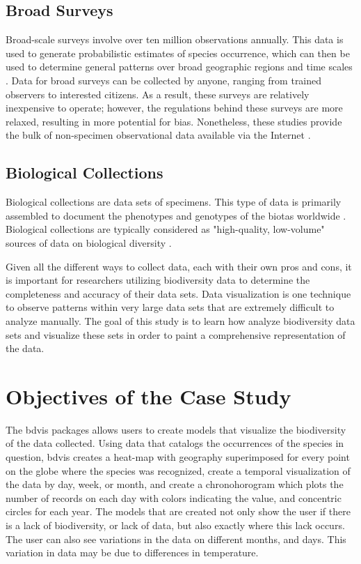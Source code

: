 \subsection{Broad  Surveys}

Broad-scale surveys involve over ten million observations annually.
This data is used to generate probabilistic estimates of species occurrence, which can then be used to determine general patterns over broad geographic regions and time scales \cite {GBIF}.
Data for broad surveys can be collected by anyone, ranging from trained observers to interested citizens.
As a result, these surveys are relatively inexpensive to operate; however, the regulations behind these surveys are more relaxed, resulting in more potential for bias.
Nonetheless, these studies provide the bulk of non-specimen observational data available via the Internet \cite {SP}.

\subsection{Biological Collections}

Biological collections are data sets of specimens.
This type of data is primarily assembled to document the phenotypes and genotypes of the biotas worldwide \cite{Barve}.
Biological collections are typically considered as "high-quality, low-volume" sources of data on biological diversity \cite{Barve}.

Given all the different ways to collect data, each with their own pros and cons, it is important for researchers utilizing biodiversity data to determine the completeness and accuracy of their data sets.
Data visualization is one technique to observe patterns within very large data sets that are extremely difficult to analyze manually.
The goal of this study is to learn how analyze biodiversity data sets and visualize these sets in order to paint a comprehensive representation of the data.

\section{Objectives of the Case Study}

The bdvis packages allows users to create models that visualize the biodiversity of the data collected.
Using data that catalogs the occurrences of the species in question, bdvis creates a  heat-map with geography superimposed for every point on the globe where the species was recognized, create a temporal visualization of the data by day, week, or month, and create a chronohorogram which plots the number of records on each day with colors indicating the value, and concentric circles for each year.
The models that are created not only show the user if there is a lack of biodiversity, or lack of data, but also exactly where this lack occurs.
The user can also see variations in the data on different months, and days.
This variation in data may be due to differences in temperature.

